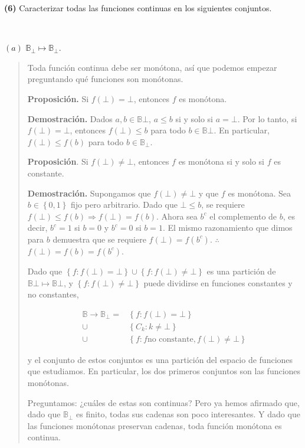 \documentclass[a4paper, 12pt]{article}
\begin{document}
\pagebreak 


\textbf{(6)} Caracterizar todas las funciones continuas en los siguientes
conjuntos.

~ 

$(a)$ $\mathbb{B}_\bot \mapsto \mathbb{B}_\bot $.


\small
\begin{quote}

Toda función continua debe ser monótona, así que podemos empezar preguntando qué
funciones son monótonas.

\textbf{Proposición.} Si $f(\bot) = \bot$, entonces $f$ es monótona.

\textbf{Demostración.} Dados $a, b \in \mathbb{B}\bot $, $a \leq b$ si y solo si $a = \bot$. Por lo tanto, si $f(\bot) = \bot $, entonces $f(\bot) \leq b$ para todo $b \in \mathbb{B}\bot$. En particular, $f(\bot ) \leq f(b)$ para todo $b \in \mathbb{B}_\bot $.

\textbf{Proposición}. Si $f(\bot) \neq \bot $, entonces $f$ es monótona si y solo si $f$ es constante.

\textbf{Demostración.} Supongamos que $f(\bot ) \neq \bot $ y que $f$ es
monótona. Sea $b \in \left\{ 0, 1 \right\} $ fijo pero arbitrario. Dado que $\bot
\leq b$, se requiere $f(\bot) \leq f(b) \Rightarrow f(\bot ) = f(b)$. Ahora sea
$b^c$ el complemento de $b$, es decir, $b^c = 1$ si $b = 0$ y $b^c = 0$ si $b =
1$. El mismo razonamiento que dimos para $b$ demuestra que se requiere $f(\bot )
= f(b^c)$. $\therefore $ $f(\bot ) = f(b) = f(b^c)$.

Dado que $\left\{ f : f(\bot) = \bot \right\} \cup \left\{ f : f(\bot ) \neq
\bot \right\} $ es una partición de $\mathbb{B}\bot \mapsto \mathbb{B}\bot $, y
$\left\{ f : f(\bot ) \neq \bot \right\} $ puede dividirse en funciones constantes y no constantes,

\begin{align*} \mathbb{B} \to \mathbb{B}_\bot = &\left\{ f : f(\bot ) = \bot
\right\} \\ \cup &\left\{ C_k : k \neq \bot \right\}\\ \cup &\left\{ f : f \text{
no constante}, f(\bot ) \neq \bot \right\} \end{align*}

y el conjunto de estos conjuntos es una partición del espacio de funciones que
estudiamos. En particular, los dos primeros conjuntos son las funciones monótonas.

Preguntamos: ¿cuáles de estas son continuas? Pero ya hemos afirmado que, dado que $\mathbb{B}_\bot $ es finito, todas sus cadenas son poco interesantes. Y dado que las funciones monótonas preservan cadenas, toda función monótona es continua.


\end{quote}
\end{document}
